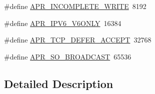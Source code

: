 \begin{DoxyCompactItemize}
\item 
\#define \hyperlink{group__apr__sockopt_ga0c1544983845bf747b4a2a3facfb45e9}{A\-P\-R\-\_\-\-I\-N\-C\-O\-M\-P\-L\-E\-T\-E\-\_\-\-W\-R\-I\-T\-E}~8192
\item 
\#define \hyperlink{group__apr__sockopt_gae1126f69a19a23c484e3292b016375df}{A\-P\-R\-\_\-\-I\-P\-V6\-\_\-\-V6\-O\-N\-L\-Y}~16384
\item 
\#define \hyperlink{group__apr__sockopt_gaa81adac9b40a87f1d4c0c2f037e9af78}{A\-P\-R\-\_\-\-T\-C\-P\-\_\-\-D\-E\-F\-E\-R\-\_\-\-A\-C\-C\-E\-P\-T}~32768
\item 
\#define \hyperlink{group__apr__sockopt_ga6d86c537799f60d68d2016563beef15b}{A\-P\-R\-\_\-\-S\-O\-\_\-\-B\-R\-O\-A\-D\-C\-A\-S\-T}~65536
\end{DoxyCompactItemize}


\subsection{Detailed Description}


